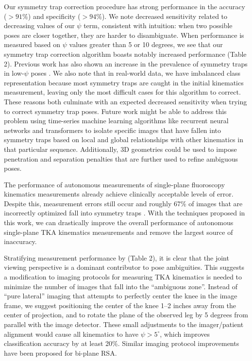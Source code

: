 {Our symmetry trap correction procedure has strong performance in the accuracy ($>91\%$) and specificity ($>94\%$).
We note decreased sensitivity related to decreasing values of our $\psi$ term, consistent with intuition: when two possible poses are closer together, they are harder to disambiguate.
When performance is measured based on $\psi$ values greater than 5 or 10 degrees, we see that our symmetry trap correction algorithm boasts notably increased performance (Table 2).
Previous work has also shown an increase in the prevalence of symmetry traps in low-$\psi$ poses \cite{jensenJointTrackMachine2023}.
We also note that in real-world data, we have imbalanced class representation because most symmetry traps are caught in the initial kinematics measurement, leaving only the most difficult cases for this algorithm to correct.
These reasons both culminate with an expected decreased sensitivity when trying to correct symmetry trap poses.
Future work might be able to address this problem using time-series machine learning algorithms like recurrent neural networks \cite{hochreiterLongShortTermMemory1997} and transformers \cite{vaswaniAttentionAllYou2017} to isolate specific images that have fallen into symmetry traps based on local and global relationships with other kinematics in that particular sequence.
Additionally, 3D geometries could be used to impose penetration and separation penalties that are further used to refine ambiguous poses.


The performance of autonomous measurements of single-plane fluoroscopy kinematics measurements already achieve clinically acceptable levels of error.
Despite this, measurement errors still occur and roughly 67\% of images that are incorrectly optimized fall into symmetry traps \cite{jensenJointTrackMachine2023,brobergValidationMachineLearning2023}.
With the techniques proposed in this work, we can drastically improve the overall performance of autonomous single-plane TKA kinematics measurements and remove the largest source of inaccuracy.


Stratifying measurement performance by  (Table 2), it is clear that the joint viewing perspective is a dominant contributor to pose ambiguities.
This suggests a modification to imaging protocols for measuring TKA kinematics is needed to minimize the number of images that fall into the “ambiguous zone”.
Instead of “pure lateral” imaging that attempts to perfectly center the knee in the image frame, we suggest positioning the center of the knee 1–2 inches away from the center of projection, and to rotate the plane of the observed leg by 5 degrees from parallel with the image detector.
These small adjustments to the imager/patient alignment would cause all kinematics to have $\psi > 5^{\circ}$, which improves classification accuracy by at least 20\%. Similar imaging protocol improvements have been proposed for bi-plane RSA\cite{niesenReorientingTibialBaseplate2020}.

}
